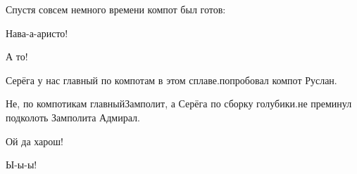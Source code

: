 Спустя совсем немного времени компот был готов:

\diagdash Нава-а-аристо!

\diagdash А то!

\diagdash Серёга у нас главный по компотам в этом сплаве.\mdash попробовал компот Руслан.

\diagdash Не, по компотикам главный\mdash Замполит, а Серёга по сборку голубики.\mdash не преминул подколоть Замполита Адмирал.

\diagdash Ой да харош!

\diagdash Ы-ы-ы!



\begin{center}
\end{center}
